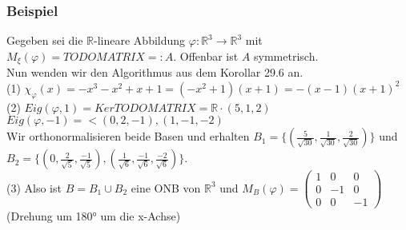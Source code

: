 \documentclass[a4paper]{article}
\let\phi\varphi
\begin{document}
\subsubsection{Beispiel}
Gegeben sei die \(\mathbb{R}\)-lineare Abbildung \(\phi:\mathbb{R}^3\rightarrow\mathbb{R}^3\) mit \(M_\xi(\phi)=TODO MATRIX=: A\). Offenbar ist \(A\) symmetrisch.\\
Nun wenden wir den Algorithmus aus dem Korollar 29.6 an.\\
(1) \(\chi_\phi(x)=-x^3-x^2+x+1=(-x^2+1)(x+1)=-(x-1)(x+1)^2\)\\
(2) \(Eig(\phi,1)=Ker TODO MATRIX=\mathbb{R}\cdot (5,1,2)\)\\
\(Eig(\phi,-1)=<(0,2,-1),(1,-1,-2)\)\\
Wir orthonormalisieren beide Basen und erhalten \(B_1=\{(\frac{5}{\sqrt{30}},\frac{1}{\sqrt{30}},\frac{2}{\sqrt{30}})\}\) und \(B_2=\{(0,\frac{2}{\sqrt{5}},\frac{-1}{\sqrt{5}}),(\frac{1}{\sqrt{6}},\frac{-1}{\sqrt{6}},\frac{-2}{\sqrt{6}})\}\).\\
(3) Also ist \(B=B_1\cup B_2\) eine ONB von \(\mathbb{R}^3\) und \(M_B(\phi)=\begin{pmatrix}
1 & 0 & 0\\
0 & -1 & 0\\
0 & 0 & -1
\end{pmatrix}\) (Drehung um 180° um die x-Achse)
\end{document}
